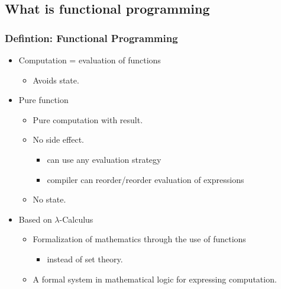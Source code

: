 \subsection{What is functional programming}

\begin{frame}
  \frametitle{Defintion: Functional Programming}
  \begin{definition}
   \begin{itemize} 
    \item Computation = evaluation of functions
      \begin{itemize}
        \item Avoids state.
      \end{itemize}
    \item Pure function
      \begin{itemize}
        \item Pure computation with result.
        \item No side effect.
          \begin{itemize}
            \item can use any evaluation strategy
            \item compiler can reorder/reorder evaluation of expressions
          \end{itemize}
        \item No state.
      \end{itemize}
     \end{itemize}   
  \end{definition}
  
  \begin{itemize}
    \item Based on $\lambda$-Calculus
      \begin{itemize}
	    \item Formalization of mathematics through the use of functions
	      \begin{itemize}
	        \item instead of set theory.
	      \end{itemize}
	    \item A formal system in mathematical logic for expressing computation.
	  \end{itemize}     
  \end{itemize}
  
\end{frame}